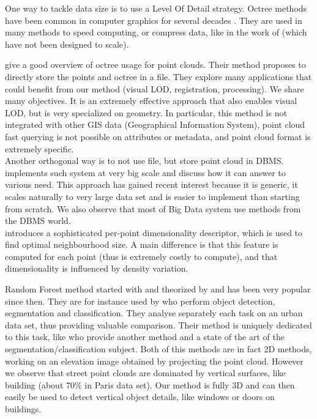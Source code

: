 		
		One way to tackle data size is to use a Level Of Detail strategy. Octree methods have been common in computer graphics for several decades \citep{Meagher1982}. They are used in many methods to speed computing, or compress data, like in the work of \cite{Schnabel2006,Huang2006} (which have not been designed to scale).
		
		\cite{Elseberg2013} give a good overview of octree usage for point clouds. Their method proposes to directly store the points and octree in a file. They explore many applications that could benefit from our method (visual LOD, registration, processing). We share many objectives. It is an extremely effective approach that also enables visual LOD, but is very specialized on geometry. In particular, this method is not integrated with other GIS data (Geographical Information System), point cloud fast querying is not possible on attributes or metadata, and point cloud format is extremely specific.
		\\
		Another orthogonal way is to not use file, but store point cloud in DBMS.  \cite{vanOosterom2014} implements such system at very big scale and discuss how it can answer to various need. This approach has gained recent interest \citep{pgPointCloud2014} because it is generic, it scales naturally to very large data set and is easier to implement than starting from scratch. We also observe that most of Big Data system use methods from the DBMS world.
		\\ 
		\cite{Demantke2014} introduces a sophisticated per-point dimensionality descriptor, which is used to find optimal neighbourhood size. A main difference is that this feature is computed for each point (thus is extremely costly to compute), and that dimensionality is influenced by density variation.
		
		Random Forest method started with \cite{Amit97shapequantization} and theorized by \cite{Breiman2001} and has been very popular since then. They are for instance used by \cite{Golovinskiy2009} who perform object detection, segmentation and classification. They analyse separately each task on an urban data set, thus providing valuable comparison. Their method is uniquely dedicated to this task, like \cite{Serna2014} who provide another method and a state of the art of the segmentation/classification subject.
		Both of this methods are in fact 2D methods, working on an elevation image obtained by projecting the point cloud. However we observe that street point clouds are dominated by vertical surfaces, like building (about 70\% in Paris data set). Our method is fully 3D and can then easily be used to detect vertical object details, like windows or doors on buildings.
		 
